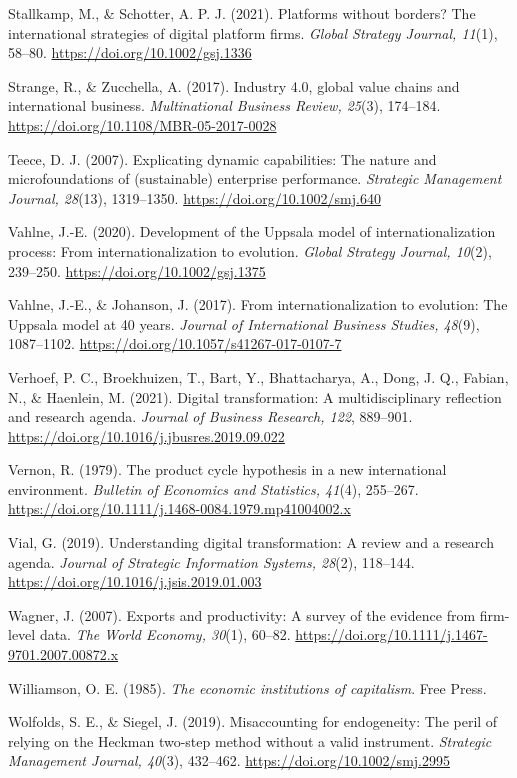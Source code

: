\documentclass[12pt,a4paper]{article}
\begin{document}
Stallkamp, M., \& Schotter, A. P. J. (2021). Platforms without borders?
The international strategies of digital platform firms. \emph{Global
Strategy Journal, 11}(1), 58--80. \url{https://doi.org/10.1002/gsj.1336}

Strange, R., \& Zucchella, A. (2017). Industry 4.0, global value chains
and international business. \emph{Multinational Business Review, 25}(3),
174--184. \url{https://doi.org/10.1108/MBR-05-2017-0028}

Teece, D. J. (2007). Explicating dynamic capabilities: The nature and
microfoundations of (sustainable) enterprise performance.
\emph{Strategic Management Journal, 28}(13), 1319--1350.
\url{https://doi.org/10.1002/smj.640}

Vahlne, J.-E. (2020). Development of the Uppsala model of
internationalization process: From internationalization to evolution.
\emph{Global Strategy Journal, 10}(2), 239--250.
\url{https://doi.org/10.1002/gsj.1375}

Vahlne, J.-E., \& Johanson, J. (2017). From internationalization to
evolution: The Uppsala model at 40 years. \emph{Journal of International
Business Studies, 48}(9), 1087--1102.
\url{https://doi.org/10.1057/s41267-017-0107-7}

Verhoef, P. C., Broekhuizen, T., Bart, Y., Bhattacharya, A., Dong, J.
Q., Fabian, N., \& Haenlein, M. (2021). Digital transformation: A
multidisciplinary reflection and research agenda. \emph{Journal of
Business Research, 122}, 889--901.
\url{https://doi.org/10.1016/j.jbusres.2019.09.022}

Vernon, R. (1979). The product cycle hypothesis in a new international
environment. \emph{Bulletin of Economics and Statistics, 41}(4),
255--267. \url{https://doi.org/10.1111/j.1468-0084.1979.mp41004002.x}

Vial, G. (2019). Understanding digital transformation: A review and a
research agenda. \emph{Journal of Strategic Information Systems, 28}(2),
118--144. \url{https://doi.org/10.1016/j.jsis.2019.01.003}

Wagner, J. (2007). Exports and productivity: A survey of the evidence
from firm-level data. \emph{The World Economy, 30}(1), 60--82.
\url{https://doi.org/10.1111/j.1467-9701.2007.00872.x}

Williamson, O. E. (1985). \emph{The economic institutions of
capitalism}. Free Press.

Wolfolds, S. E., \& Siegel, J. (2019). Misaccounting for endogeneity:
The peril of relying on the Heckman two-step method without a valid
instrument. \emph{Strategic Management Journal, 40}(3), 432--462.
\url{https://doi.org/10.1002/smj.2995}
\end{document}
